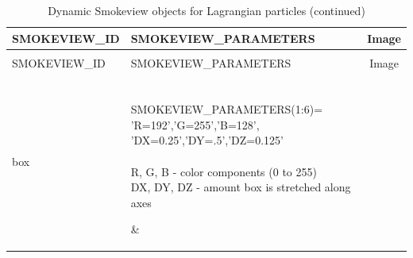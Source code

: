 \begin{longtable}[ht]{|l|l|c|}
\caption{Dynamic Smokeview objects for Lagrangian particles}
\label{tab:devices_dynamic2}
\\ \hline
{\ct SMOKEVIEW\_ID}  & {\ct SMOKEVIEW\_PARAMETERS} & Image  \\ \hline \hline
\endfirsthead
\caption{Dynamic Smokeview objects for Lagrangian particles (continued)}
\\ \hline
{\ct SMOKEVIEW\_ID}  & {\ct SMOKEVIEW\_PARAMETERS} & Image  \\ \hline \hline
\endhead

{\ct box} &
\parbox[c]{\boxwidth}{
\hspace{1in} \\
{\ct SMOKEVIEW\_PARAMETERS(1:6)=}\\
{\ct 'R=192','G=255','B=128',}\\
{\ct 'DX=0.25','DY=.5','DZ=0.125'}\\  \\
{\ct R, G, B} - color components (0 to 255) \\
{\ct DX, DY, DZ} - amount box is stretched along axes \\
\hspace{1in}
} &
 \\ \hline

{\ct tube} &
\parbox[c]{\boxwidth}{
\hspace{1in} \\
{\ct SMOKEVIEW\_PARAMETERS(1:6)=}\\
{\ct 'R=255','G=0','B=0',}\\
{\ct 'D=0.2','L=0.6','RANDXY=1'}\\ \\
{\ct R, G, B} - color components (0 to 255) \\
{\ct D, L} - diameter and length (m) \\
{\ct RANDXY} - randomly orient in x-y plane \\
{\ct RANDXZ} - randomly orient in x-z plane \\
{\ct RANDYZ} - randomly orient in y-z plane \\
{\ct RANDXYZ} - random orientation \\
{\ct DIRX, DIRY, DIRZ} - orient along axis \\
\hspace{1in}
} &
 \\ \hline


\end{longtable}
